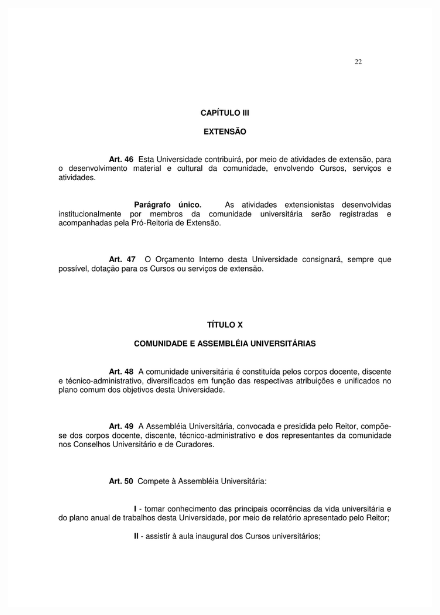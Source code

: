 \begin{figure}[p]
	\centering 
	\includegraphics[scale=0.7]{capitulos/resolucoes/cuni414/cuni414-22.pdf}
\end{figure}

